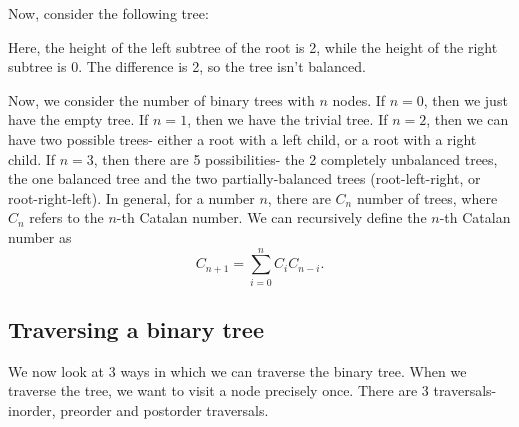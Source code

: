 \documentclass[a4paper, openany]{memoir}
\begin{document}
\noindent Now, consider the following tree:
\begin{center}
\end{center}
Here, the height of the left subtree of the root is 2, while the height of the right subtree is 0. The difference is 2, so the tree isn't balanced.

\noindent Now, we consider the number of binary trees with $n$ nodes. If $n = 0$, then we just have the empty tree. If $n = 1$, then we have the trivial tree. If $n = 2$, then we can have two possible trees- either a root with a left child, or a root with a right child. If $n = 3$, then there are 5 possibilities- the 2 completely unbalanced trees, the one balanced tree and the two partially-balanced trees (root-left-right, or root-right-left). In general, for a number $n$, there are $C_n$ number of trees, where $C_n$ refers to the $n$-th Catalan number. We can recursively define the $n$-th Catalan number as
\[C_{n+1} = \sum_{i = 0}^n C_{i} C_{n-i}.\]

\subsection{Traversing a binary tree}
We now look at 3 ways in which we can traverse the binary tree. When we traverse the tree, we want to visit a node precisely once. There are 3 traversals- inorder, preorder and postorder traversals.
\end{document}
